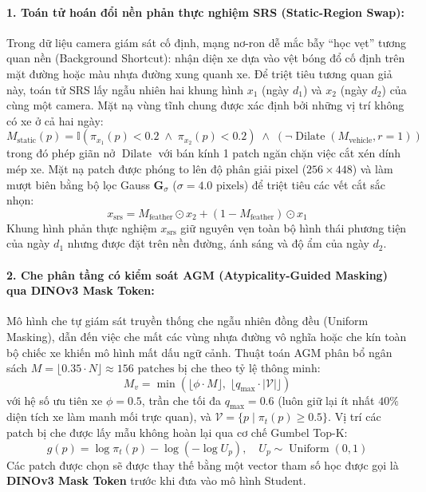 \documentclass[11pt,a4paper]{article}
\begin{document}
\paragraph{1. Toán tử hoán đổi nền phản thực nghiệm SRS (Static-Region Swap):}
Trong dữ liệu camera giám sát cố định, mạng nơ-ron dễ mắc bẫy ``học vẹt'' tương quan nền (Background Shortcut): nhận diện xe dựa vào vệt bóng đổ cố định trên mặt đường hoặc màu nhựa đường xung quanh xe.
Để triệt tiêu tương quan giả này, toán tử SRS lấy ngẫu nhiên hai khung hình $x_1$ (ngày $d_1$) và $x_2$ (ngày $d_2$) của cùng một camera. Mặt nạ vùng tĩnh chung được xác định bởi những vị trí không có xe ở cả hai ngày:
\begin{equation}
    M_{\text{static}}(p) = \mathbb{I}\left(\pi_{x_1}(p) < 0.2 \;\land\; \pi_{x_2}(p) < 0.2\right) \;\land\; (\neg \operatorname{Dilate}(M_{\text{vehicle}}, r=1))
\end{equation}
trong đó phép giãn nở $\operatorname{Dilate}$ với bán kính 1 patch ngăn chặn việc cắt xén dính mép xe. Mặt nạ patch được phóng to lên độ phân giải pixel ($256 \times 448$) và làm mượt biên bằng bộ lọc Gauss $\mathbf{G}_\sigma$ ($\sigma = 4.0\text{ pixels}$) để triệt tiêu các vết cắt sắc nhọn:
\begin{equation}
    x_{\text{srs}} = M_{\text{feather}} \odot x_2 + (1 - M_{\text{feather}}) \odot x_1
\end{equation}
Khung hình phản thực nghiệm $x_{\text{srs}}$ giữ nguyên vẹn toàn bộ hình thái phương tiện của ngày $d_1$ nhưng được đặt trên nền đường, ánh sáng và độ ẩm của ngày $d_2$.

\paragraph{2. Che phân tầng có kiểm soát AGM (Atypicality-Guided Masking) qua DINOv3 Mask Token:}
Mô hình che tự giám sát truyền thống che ngẫu nhiên đồng đều (Uniform Masking), dẫn đến việc che mất các vùng nhựa đường vô nghĩa hoặc che kín toàn bộ chiếc xe khiến mô hình mất dấu ngữ cảnh. 
Thuật toán AGM phân bổ ngân sách $M = \lfloor 0.35 \cdot N \rfloor \approx 156\text{ patches}$ bị che theo tỷ lệ thông minh:
\begin{equation}
    M_v = \min\left( \lfloor \phi \cdot M \rfloor, \; \lfloor q_{\max} \cdot |\mathcal{V}| \rfloor \right)
\end{equation}
với hệ số ưu tiên xe $\phi = 0.5$, trần che tối đa $q_{\max} = 0.6$ (luôn giữ lại ít nhất $40\%$ diện tích xe làm manh mối trực quan), và $\mathcal{V} = \{p \mid \pi_t(p) \ge 0.5\}$. Vị trí các patch bị che được lấy mẫu không hoàn lại qua cơ chế Gumbel Top-K:
\begin{equation}
    g(p) = \log \pi_t(p) - \log(-\log U_p), \quad U_p \sim \operatorname{Uniform}(0, 1)
\end{equation}
Các patch được chọn sẽ được thay thế bằng một vector tham số học được gọi là \textbf{DINOv3 Mask Token} trước khi đưa vào mô hình Student.
\end{document}
